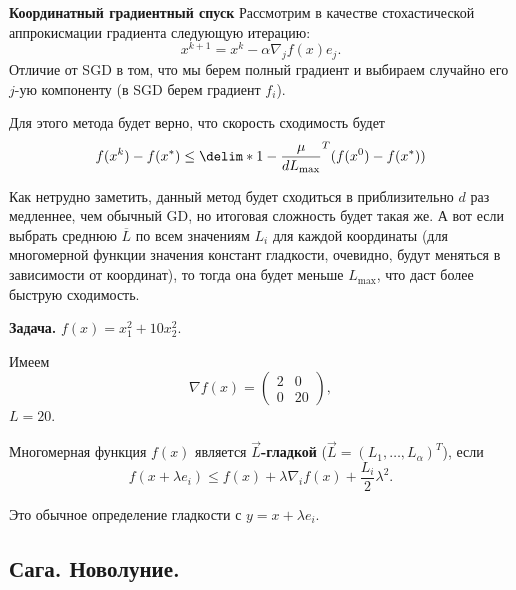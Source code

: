 \begin{task}
    \textbf{Координатный градиентный спуск}
    Рассмотрим в качестве стохастической аппрокисмации градиента следующую итерацию:
    \begin{equation*}
        x^{k + 1} = x^k - \alpha \nabla_j f(x) e_j.
    \end{equation*}
    Отличие от SGD в том, что мы берем полный градиент и выбираем случайно его $j$-ую компоненту (в SGD берем градиент $f_i$).
    
    Для этого метода будет верно, что скорость сходимость будет 
    \begin{equation*}
        f(x^k) - f(x^*) \leq \delim*{1 - \frac{\mu}{dL_{\max}}}^T (f(x^0) - f(x^*))
    \end{equation*}
\end{task}

Как нетрудно заметить, данный метод будет сходиться в приблизительно $d$ раз медленнее, чем обычный GD, но итоговая сложность будет такая же. А вот если выбрать среднюю $\overline{L}$ по всем значениям $L_i$ для каждой координаты (для многомерной функции значения констант гладкости, очевидно, будут меняться в зависимости от координат), то тогда она будет меньше $L_{\text{max}}$, что даст более быструю сходимость.

\begin{example}
    \textbf{Задача.} $f(x) = x_1^2 + 10x_2^2$.
\end{example}

Имеем
\begin{equation*}
    \nabla f(x) = \begin{pmatrix} 2 & 0 \\ 0 & 20 \end{pmatrix},
\end{equation*}
$L = 20$.

\begin{definition}
    Многомерная функция $f(x)$ является \textbf{$\vec{L}$-гладкой} ($\vec{L} = (L_1, \ldots, L_\alpha)^T$), если 
    \begin{equation*}
        f(x + \lambda e_i) \leq f(x) + \lambda \nabla_i f(x) + \frac{L_i}{2}\lambda^2.    
    \end{equation*}
\end{definition}
Это обычное определение гладкости с $y = x + \lambda e_i$.

\subsection{Сага. Новолуние.}


